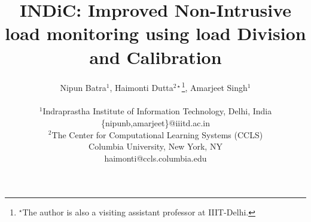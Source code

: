 \documentclass[conference]{IEEEtran}
\newcommand{\indicns}{INDiC}
\begin{document}
%
\title{\indicns: Improved Non-Intrusive load monitoring using load Division and Calibration \vspace{-12mm}}

\author{%
{Nipun Batra$^1$, Haimonti Dutta$^{2\star}$\thanks{$^\star$The author is also a visiting assistant professor at IIIT-Delhi.}, Amarjeet Singh$^1$}%
\vspace{-8pt}\\


\\
$^1$Indraprastha Institute of Information Technology, Delhi, India\\
\{nipunb,amarjeet\}@iiitd.ac.in\\
$^2$The Center for Computational Learning Systems (CCLS)\\
Columbia University, New York, NY \\
haimonti@ccls.columbia.edu\\


\vspace{-6mm}
}
\maketitle
\end{document}
